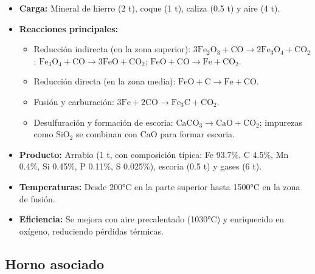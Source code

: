 \documentclass[12pt,a4paper]{article}
\begin{document}
\begin{itemize}
    \item \textbf{Carga:} Mineral de hierro (2 t), coque (1 t), caliza (0.5 t) y aire (4 t).
    \item \textbf{Reacciones principales:}
    \begin{itemize}
        \item Reducción indirecta (en la zona superior): $3\mathrm{Fe}_2\mathrm{O}_3 + \mathrm{CO} \to 2\mathrm{Fe}_3\mathrm{O}_4 + \mathrm{CO}_2$; $\mathrm{Fe}_3\mathrm{O}_4 + \mathrm{CO} \to 3\mathrm{FeO} + \mathrm{CO}_2$; $\mathrm{FeO} + \mathrm{CO} \to \mathrm{Fe} + \mathrm{CO}_2$.
        \item Reducción directa (en la zona media): $\mathrm{FeO} + \mathrm{C} \to \mathrm{Fe} + \mathrm{CO}$.
        \item Fusión y carburación: $3\mathrm{Fe} + 2\mathrm{CO} \to \mathrm{Fe}_3\mathrm{C} + \mathrm{CO}_2$.
        \item Desulfuración y formación de escoria: $\mathrm{CaCO}_3 \to \mathrm{CaO} + \mathrm{CO}_2$; impurezas como $\mathrm{SiO}_2$ se combinan con $\mathrm{CaO}$ para formar escoria.
    \end{itemize}
    \item \textbf{Producto:} Arrabio (1 t, con composición típica: Fe 93.7\%, C 4.5\%, Mn 0.4\%, Si 0.45\%, P 0.11\%, S 0.025\%), escoria (0.5 t) y gases (6 t).
    \item \textbf{Temperaturas:} Desde 200°C en la parte superior hasta 1500°C en la zona de fusión.
    \item \textbf{Eficiencia:} Se mejora con aire precalentado (1030°C) y enriquecido en oxígeno, reduciendo pérdidas térmicas.
\end{itemize}

\subsection{Horno asociado}
\end{document}

